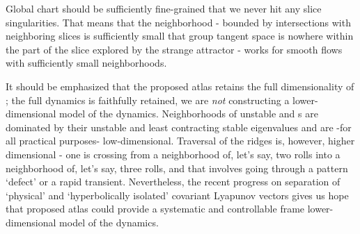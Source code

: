 Global chart should be sufficiently fine-grained that we never hit any
slice singularities. That means that the neighborhood - bounded by
intersections with neighboring slices is sufficiently small that group
tangent space is nowhere within the part of the slice explored by
the strange attractor - works for smooth flows
with sufficiently small neighborhoods.

It should be emphasized that the proposed atlas retains the full
dimensionality of \reducedsp; the full dynamics is faithfully retained,
we are \emph{not} constructing a lower-dimensional model of the dynamics.
Neighborhoods of unstable \eqva and \po s are dominated by their unstable
and least contracting stable eigenvalues and are -for all practical
purposes- low-dimensional. Traversal of the ridges is, however, higher
dimensional - one is crossing from a neighborhood of, let's say, two
rolls into a neighborhood of, let's say, three rolls, and that involves
going through a pattern `defect' or a rapid transient. Nevertheless, the
recent progress on separation of `physical' and `hyperbolically isolated'
covariant Lyapunov
vectors gives us
hope that proposed atlas could provide a systematic and controllable
frame lower-dimensional model of the dynamics.

%
